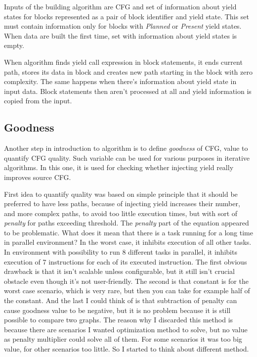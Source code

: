 Inputs of the building algorithm are CFG and set of information about yield states for blocks represented as a pair of block identifier and yield state. This set must contain information only for blocks with \emph{Planned} or \emph{Present} yield states. When data are built the first time, set with information about yield states is empty.

When algorithm finds yield call expression in block statements, it ends current path, stores its data in block and creates new path starting in the block with zero complexity. The same happens when there's information about yield state in input data. Block statements then aren't processed at all and yield information is copied from the input.

\subsection{Goodness}
Another step in introduction to algorithm is to define \emph{goodness} of CFG, value to quantify CFG quality. Such variable can be used for various purposes in iterative algorithms. In this one, it is used for checking whether injecting yield really improves source CFG.

First idea to quantify quality was based on simple principle that it should be preferred to have less paths, because of injecting yield increases their number, and more complex paths, to avoid too little execution times, but with sort of \emph{penalty} for paths exceeding threshold. The  \emph{penalty} part of the equation appeared to be problematic. What does it mean that there is a task running for a long time in parallel environment? In the worst case, it inhibits execution of all other tasks. In environment with possibility to run 8 different tasks in parallel, it inhibits execution of 7 instructions for each of its executed instruction. The first obvious drawback is that it isn't scalable unless configurable, but it still isn't crucial obstacle even though it's not user-friendly. The second is that constant is for the worst case scenario, which is very rare, but then you can take for example half of the constant. And the last I could think of is that subtraction of penalty can cause goodness value to be negative, but it is no problem because it is still possible to compare two graphs. The reason why I discarded this method is because there are scenarios I wanted optimization method to solve, but no value as penalty multiplier could solve all of them. For some scenarios it was too big value, for other scenarios too little. So I started to think about different method.

